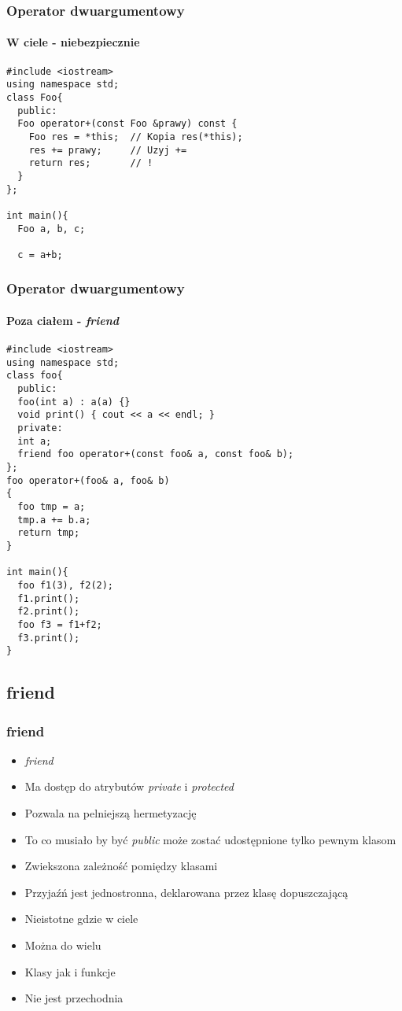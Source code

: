 \documentclass[10pt]{beamer}
\begin{document}
\begin{frame}[fragile]
  \frametitle{Operator dwuargumentowy}
  \framesubtitle{W ciele - niebezpiecznie}

    \begin{lstlisting}
#include <iostream>
using namespace std;
class Foo{
  public:
  Foo operator+(const Foo &prawy) const {
    Foo res = *this;  // Kopia res(*this);
    res += prawy;     // Uzyj +=
    return res;       // !
  }
};

int main(){
  Foo a, b, c;
  
  c = a+b;
\end{lstlisting}
\end{frame}

\begin{frame}[fragile]
  \frametitle{Operator dwuargumentowy}
  \framesubtitle{Poza ciałem - \textit{friend}}

    \begin{lstlisting}
#include <iostream>
using namespace std;
class foo{
  public:
  foo(int a) : a(a) {}
  void print() { cout << a << endl; }
  private:
  int a;
  friend foo operator+(const foo& a, const foo& b);
};
foo operator+(foo& a, foo& b)
{
  foo tmp = a;
  tmp.a += b.a;
  return tmp;
}

int main(){
  foo f1(3), f2(2);
  f1.print();
  f2.print();
  foo f3 = f1+f2;
  f3.print();
}
\end{lstlisting}
\end{frame}

\subsection{friend}

\begin{frame}
  \frametitle{friend}
  
  
  \begin{itemize}
    \item \textit{friend}
    \item Ma dostęp do atrybutów \textit{private} i \textit{protected}
    \item Pozwala na pelniejszą hermetyzację
    \item To co musiało by być \textit{public} może zostać udostępnione tylko pewnym klasom
    \item Zwiekszona zależność pomiędzy klasami
    \item Przyjaźń jest jednostronna, deklarowana przez klasę dopuszczającą
    \item Nieistotne gdzie w ciele
    \item Można do wielu
    \item Klasy jak i funkcje
    \item Nie jest przechodnia
  \end{itemize}
\end{frame}
\end{document}
